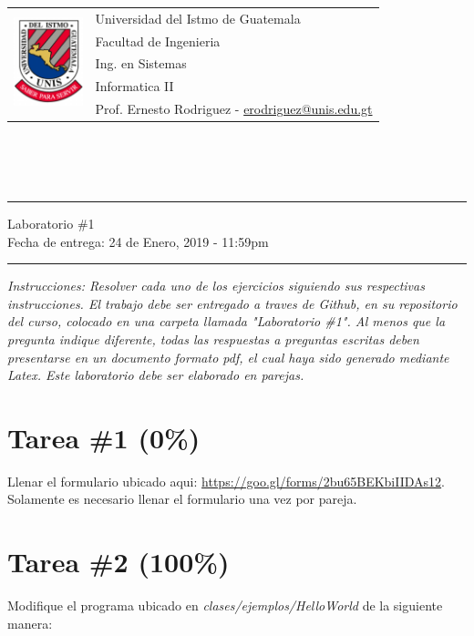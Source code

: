 \documentclass{article}
\newcommand{\horrule}[1]{\rule{\linewidth}{#1}}
\begin{document}
\begin{tabular}{l l}
\multirow{5}{*}{\includegraphics[width=2cm]{../../recursos/logo.png}} & Universidad del Istmo de Guatemala \\
 & Facultad de Ingenieria \\
 & Ing. en Sistemas \\
 & Informatica II \\
 & Prof. Ernesto Rodriguez - \href{mailto:erodriguez@unis.edu.gt}{erodriguez@unis.edu.gt} \\
\end{tabular}
\\\\\\

\begin{center}
        \horrule{0.5pt}
        \huge{Laboratorio \#1} \\
        \large{Fecha de entrega: 24 de Enero, 2019 - 11:59pm} \\
        \horrule{1pt}
\end{center}

\emph{Instrucciones: Resolver cada uno de los ejercicios siguiendo sus respectivas
instrucciones. El trabajo debe ser entregado a traves de Github, en su repositorio del curso, colocado en una carpeta llamada "Laboratorio \#1".
Al menos que la pregunta indique diferente, todas las respuestas a preguntas escritas deben presentarse en
un documento formato pdf, el cual haya sido generado mediante Latex. Este laboratorio
debe ser elaborado en parejas.}

\section*{Tarea \#1 (0\%)}

Llenar el formulario ubicado aqui: \url{https://goo.gl/forms/2bu65BEKbiIIDAs12}. Solamente
es necesario llenar el formulario una vez por pareja.

\section*{Tarea \#2 (100\%)}

Modifique el programa ubicado en \emph{clases/ejemplos/HelloWorld} de la siguiente manera:
\end{document}
